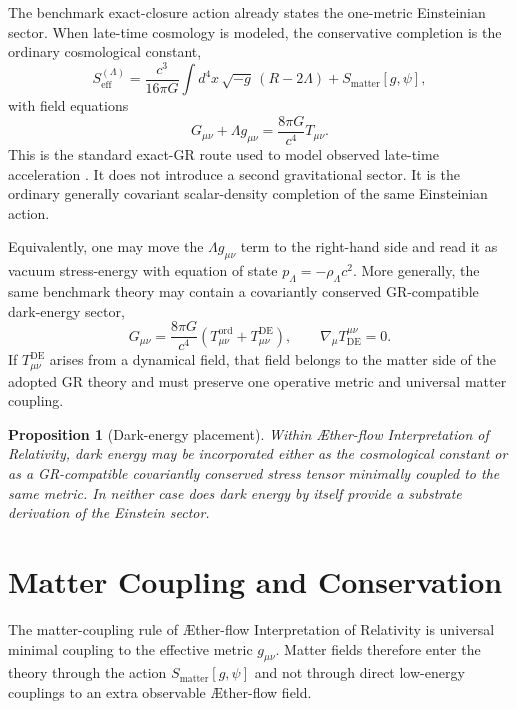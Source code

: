 \documentclass[11pt]{article}
\newcommand{\Aflow}{\AE{}ther-flow}
\newcommand{\TheoryName}{\Aflow{} Interpretation of Relativity}
\newtheorem{proposition}{Proposition}
\begin{document}
The benchmark exact-closure action already states the one-metric Einsteinian sector. When late-time cosmology is modeled, the conservative completion is the ordinary cosmological constant,
\begin{equation}
S_{\mathrm{eff}}^{(\Lambda)}
=
\frac{c^3}{16\pi G}\int d^4x\,\sqrt{-g}\,\left(R-2\Lambda\right)
+
S_{\mathrm{matter}}[g,\psi],
\label{eq:SA_lambda}
\end{equation}
with field equations
\begin{equation}
G_{\mu\nu}+\Lambda g_{\mu\nu}
=
\frac{8\pi G}{c^4}T_{\mu\nu}.
\label{eq:einstein_lambda}
\end{equation}
This is the standard exact-GR route used to model observed late-time acceleration \cite{Riess1998,Perlmutter1999,Planck2018Parameters}. It does not introduce a second gravitational sector. It is the ordinary generally covariant scalar-density completion of the same Einsteinian action.

Equivalently, one may move the \(\Lambda g_{\mu\nu}\) term to the right-hand side and read it as vacuum stress-energy with equation of state \(p_{\Lambda}=-\rho_{\Lambda}c^2\). More generally, the same benchmark theory may contain a covariantly conserved GR-compatible dark-energy sector,
\begin{equation}
G_{\mu\nu}
=
\frac{8\pi G}{c^4}\left(T_{\mu\nu}^{\mathrm{ord}}+T_{\mu\nu}^{\mathrm{DE}}\right),
\qquad
\nabla_\mu T_{\mathrm{DE}}^{\mu\nu}=0.
\label{eq:de_sector}
\end{equation}
If \(T_{\mu\nu}^{\mathrm{DE}}\) arises from a dynamical field, that field belongs to the matter side of the adopted GR theory and must preserve one operative metric and universal matter coupling.

\begin{proposition}[Dark-energy placement]
Within \TheoryName{}, dark energy may be incorporated either as the cosmological constant or as a GR-compatible covariantly conserved stress tensor minimally coupled to the same metric. In neither case does dark energy by itself provide a substrate derivation of the Einstein sector.
\end{proposition}

\section{Matter Coupling and Conservation}

The matter-coupling rule of \TheoryName{} is universal minimal coupling to the effective metric \(g_{\mu\nu}\). Matter fields therefore enter the theory through the action \(S_{\mathrm{matter}}[g,\psi]\) and not through direct low-energy couplings to an extra observable \Aflow{} field.
\end{document}
